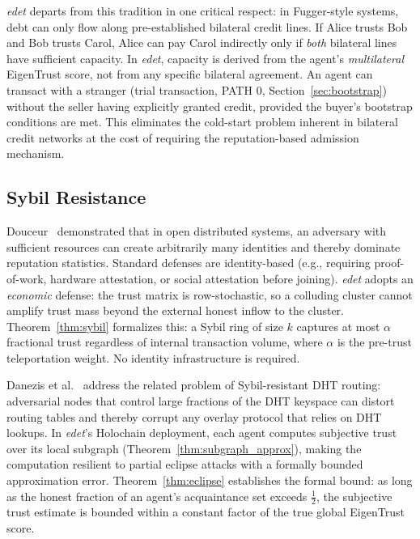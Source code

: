 \documentclass[11pt]{article}
\begin{document}
\emph{edet} departs from this tradition in one critical respect: in Fugger-style systems, debt can only flow along pre-established bilateral credit lines. If Alice trusts Bob and Bob trusts Carol, Alice can pay Carol indirectly only if \emph{both} bilateral lines have sufficient capacity. In \emph{edet}, capacity is derived from the agent's \emph{multilateral} EigenTrust score, not from any specific bilateral agreement. An agent can transact with a stranger (trial transaction, PATH 0, Section~\ref{sec:bootstrap}) without the seller having explicitly granted credit, provided the buyer's bootstrap conditions are met. This eliminates the cold-start problem inherent in bilateral credit networks at the cost of requiring the reputation-based admission mechanism.

\subsection{Sybil Resistance}

Douceur~\cite{douceur2002} demonstrated that in open distributed systems, an adversary with sufficient resources can create arbitrarily many identities and thereby dominate reputation statistics. Standard defenses are identity-based (e.g., requiring proof-of-work, hardware attestation, or social attestation before joining). \emph{edet} adopts an \emph{economic} defense: the trust matrix is row-stochastic, so a colluding cluster cannot amplify trust mass beyond the external honest inflow to the cluster. Theorem~\ref{thm:sybil} formalizes this: a Sybil ring of size $k$ captures at most $\alpha$ fractional trust regardless of internal transaction volume, where $\alpha$ is the pre-trust teleportation weight. No identity infrastructure is required.

Danezis et al.~\cite{danezis2005} address the related problem of Sybil-resistant DHT routing: adversarial nodes that control large fractions of the DHT keyspace can distort routing tables and thereby corrupt any overlay protocol that relies on DHT lookups. In \emph{edet}'s Holochain deployment, each agent computes subjective trust over its local subgraph (Theorem~\ref{thm:subgraph_approx}), making the computation resilient to partial eclipse attacks with a formally bounded approximation error. Theorem~\ref{thm:eclipse} establishes the formal bound: as long as the honest fraction of an agent's acquaintance set exceeds $\frac{1}{2}$, the subjective trust estimate is bounded within a constant factor of the true global EigenTrust score.
\end{document}
